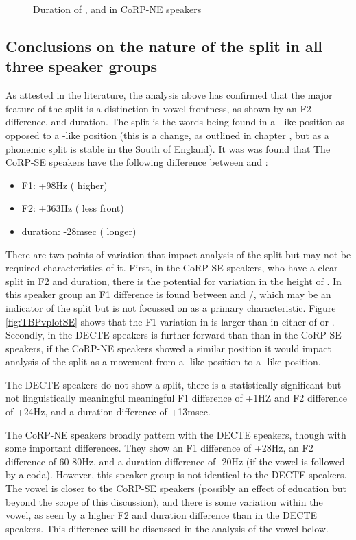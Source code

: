 \documentclass[../../00.FullDoc/tex/Thesis]{subfiles}
\begin{document}
\begin{figure}[h]
	
	\caption{Duration of \trap{}, \bath{} and \palm{} in CoRP-NE speakers} \label{fig:TBdurNE}
\end{figure}

\subsection{Conclusions on the nature of the \TB{} split in all three speaker groups}
As attested in the literature, the analysis above has confirmed that the major feature of the \TB{} split is a distinction in vowel frontness, as shown by an F2 difference, and duration. The \TB{} split is the \bath{} words being found in a \palm{}-like position as opposed to a \trap{}-like position (this is a change, as outlined in chapter \notinsubfile{\ref{ch:LitReviewSocio}} , but as a phonemic split is stable in the South of England).
It was was found that The CoRP-SE speakers have the following difference between \trap{} and \bath{}:
\begin{itemize}
	\item F1: +98Hz (\bath{} higher)
	\item F2: +363Hz (\bath{} less front)
	\item duration: -28msec (\bath{} longer)
\end{itemize}
There are two points of variation that impact analysis of the split but may not be required characteristics of it. First, in the CoRP-SE speakers, who have a clear \TB{} split in F2 and duration, there is the potential for variation in the height of \trap{}. In this speaker group an F1 difference is found between \trap{} and \bath{}/\palm{}, which may be an indicator of the split but is not focussed on as a primary characteristic. Figure \ref{fig:TBPvplotSE} shows that the F1 variation in \trap{} is larger than in either of \bath{} or \palm{}. Secondly, in the DECTE speakers \palm{} is further forward than than in the CoRP-SE speakers, if the CoRP-NE speakers showed a similar position it would impact analysis of the split as a movement from a \trap{}-like position to a \palm{}-like position.

The DECTE speakers do not show a split, there is a statistically significant but not linguistically meaningful meaningful F1 difference of +1HZ and F2 difference of +24Hz, and a duration difference of +13msec.

The CoRP-NE speakers broadly pattern with the DECTE speakers, though with some important differences. They show an F1 difference of +28Hz, an F2 difference of 60-80Hz, and a duration difference of -20Hz (if the vowel is followed by a coda). However, this speaker group is not identical to the DECTE speakers. The \palm{} vowel is closer to the CoRP-SE speakers (possibly an effect of education but beyond the scope of this discussion), and there is some variation within the \bath{} vowel, as seen by a higher F2 and duration difference than in the DECTE speakers. This difference will be discussed in the analysis of the \bath{} vowel below.
\end{document}
